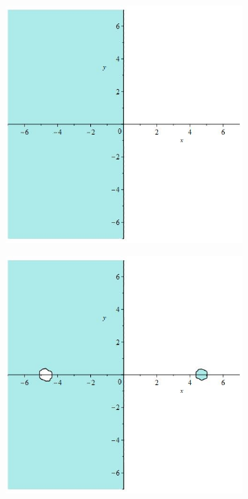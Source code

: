 \documentclass[12pt]{article}
\begin{document}
\begin{figure}[H]
    \begin{subfigure}{0.24\textwidth}
        \includegraphics[width=0.9\linewidth]{stabrks3_6.jpg}
    \end{subfigure}
    \begin{subfigure}{0.24\textwidth}
        \includegraphics[width=0.9\linewidth]{stabrks3_7.jpg}

\end{subfigure}
\end{figure}
\end{document}
